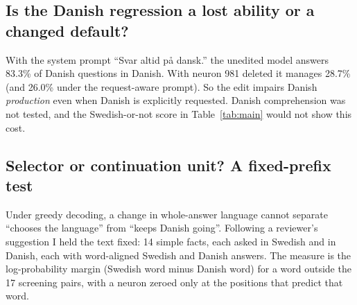\documentclass[10pt,a4paper]{article}
\begin{document}
\subsection{Is the Danish regression a lost ability or a changed default?}

With the system prompt ``Svar altid på dansk.'' the unedited model answers 83.3\% of Danish questions in Danish. With neuron 981 deleted it manages 28.7\% (and 26.0\% under the request-aware prompt).
So the edit impairs Danish \emph{production} even when Danish is explicitly requested. Danish comprehension was not tested, and the Swedish-or-not score in Table~\ref{tab:main} would not show this cost.

\subsection{Selector or continuation unit? A fixed-prefix test}\label{sec:prefix}

Under greedy decoding, a change in whole-answer language cannot separate ``chooses the language'' from ``keeps Danish going''. Following a reviewer's suggestion I held the text fixed:
14 simple facts, each asked in Swedish and in Danish, each with word-aligned Swedish and Danish answers. The measure is the log-probability margin (Swedish word minus Danish word) for a word outside the 17 screening pairs,
with a neuron zeroed only at the positions that predict that word.

\begin{table}[H]\footnotesize\centering
{}
\caption{Fixed-prefix test, 14 facts per row; margins and changes in nats, positive = towards Swedish. Control: the layer-23 neuron with the closest output-norm $\times$ activation.}\label{tab:prefix}
\end{table}
\end{document}
